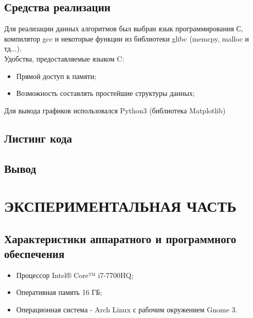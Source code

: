 \documentclass[a4paper,12pt]{article}
\begin{document}
\newpage
\subsection{Средства реализации}
Для реализации данных алгоритмов был выбран язык программирования С, компилятор
gcc и некоторые функции из библиотеки glibc (memcpy, malloc и тд...). \\
Удобства, предоставляемые языком C:
\begin{itemize}
\item Прямой доступ к памяти;
\item Возможность составлять простейшие структуры данных;
\end{itemize}
Для вывода графиков использовался Python3 (библиотека Matplotlib)

\newpage
\subsection{Листинг кода}





\newpage
\subsection{Вывод}

\newpage
\section{ЭКСПЕРИМЕНТАЛЬНАЯ ЧАСТЬ}
\subsection{Характеристики аппаратного и программного обеспечения}
\begin{itemize}
\item Процессор Intel® Core™ i7-7700HQ;
\item Оперативная память 16 ГБ;
\item Операционная система - Arch Linux с рабочим окружением Gnome 3.
\end{itemize}
\end{document}
